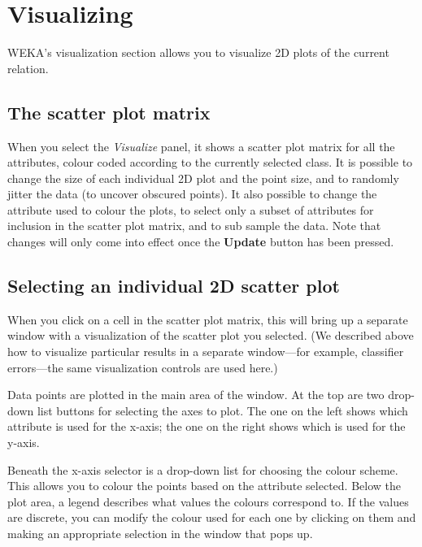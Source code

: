 \documentclass[a4paper]{article}
\begin{document}
\newpage

\section{Visualizing}

\begin{center}
\end{center}

WEKA's visualization section allows you to visualize 2D plots of the
current relation.  

\subsection{The scatter plot matrix}

When you select the {\em Visualize} panel, it shows a scatter plot
matrix for all the attributes, colour coded according to the currently
selected class. It is possible to change the size of each individual
2D plot and the point size, and to randomly jitter the data (to
uncover obscured points). It also possible to change the attribute
used to colour the plots, to select only a subset of attributes for
inclusion in the scatter plot matrix, and to sub sample the data. Note
that changes will only come into effect once the \textbf{Update}
button has been pressed.

\subsection{Selecting an individual 2D scatter plot}
 
When you click on a cell in the scatter plot matrix, this will bring
up a separate window with a visualization of the scatter plot you
selected.  (We described above how to visualize particular results in
a separate window---for example, classifier errors---the same
visualization controls are used here.)

Data points are plotted in the main area of the window.  At the top
are two drop-down list buttons for selecting the axes to plot.  The
one on the left shows which attribute is used for the x-axis; the one
on the right shows which is used for the y-axis.

Beneath the x-axis selector is a drop-down list for choosing the
colour scheme.  This allows you to colour the points based on the
attribute selected.  Below the plot area, a legend describes what
values the colours correspond to. If the values are discrete, you can
modify the colour used for each one by clicking on them and making an
appropriate selection in the window that pops up.
\end{document}
